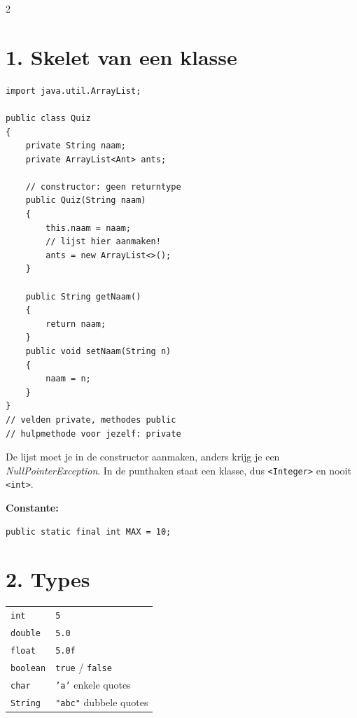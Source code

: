 \documentclass[12pt,a4paper]{extarticle}
\begin{document}
\begin{multicols}{2}

    \section{1. Skelet van een klasse}
    \begin{lstlisting}
import java.util.ArrayList;

public class Quiz
{
    private String naam;
    private ArrayList<Ant> ants;

    // constructor: geen returntype
    public Quiz(String naam)
    {
        this.naam = naam;
        // lijst hier aanmaken!
        ants = new ArrayList<>();
    }

    public String getNaam()
    {
        return naam;
    }
    public void setNaam(String n)
    {
        naam = n;
    }
}
// velden private, methodes public
// hulpmethode voor jezelf: private
\end{lstlisting}
    De lijst moet je in de constructor aanmaken, anders krijg je een
    \emph{NullPointerException}. In de punthaken staat een klasse, dus
    \texttt{<Integer>} en nooit \texttt{<int>}.

    \textbf{Constante:}
    \begin{lstlisting}
public static final int MAX = 10;
\end{lstlisting}

    \section{2. Types}
    \begin{center}
        \small
        \begin{tabular}{@{}ll@{}}
            \toprule
            \texttt{int}     & \texttt{5}                     \\
            \texttt{double}  & \texttt{5.0}                   \\
            \texttt{float}   & \texttt{5.0f}                  \\
            \texttt{boolean} & \texttt{true} / \texttt{false} \\
            \texttt{char}    & \texttt{'a'} enkele quotes     \\
            \texttt{String}  & \texttt{"abc"} dubbele quotes  \\
            \bottomrule
        \end{tabular}
    \end{center}


\end{multicols}
\end{document}

